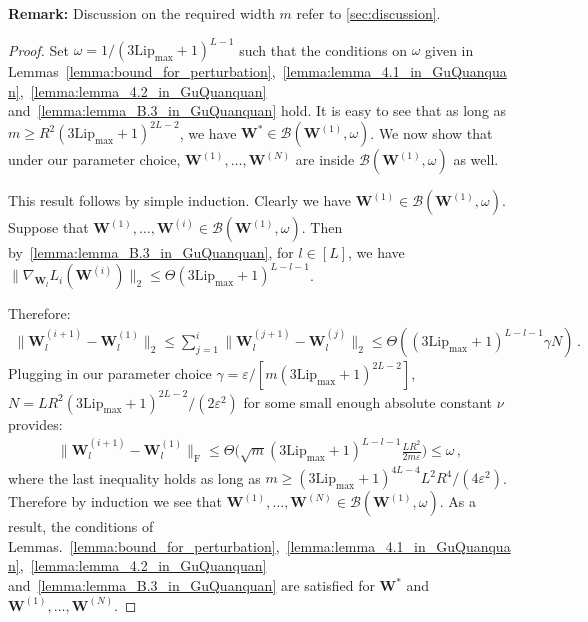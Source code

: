 \documentclass[nohyperref]{article}
\theoremstyle{plain}
\theoremstyle{definition}
\theoremstyle{remark}
\begin{document}
{\bf Remark:} Discussion on the required width $m$ refer to \cref{sec:discussion}.
\begin{proof}
Set $\omega = 1/(3\mathrm{Lip}_{\max}+1)^{L-1}$ such that the conditions on $\omega$ given in Lemmas~\ref{lemma:bound_for_perturbation},~\ref{lemma:lemma_4.1_in_GuQuanquan},~\ref{lemma:lemma_4.2_in_GuQuanquan} and~\ref{lemma:lemma_B.3_in_GuQuanquan} hold. It is easy to see that as long as $m \geq R^2 (3\mathrm{Lip}_{\max}+1)^{2L-2}$, we have $\bm{W}^* \in \mathcal{B} (\bm{W}^{(1)}, \omega)$. 
We now show that under our parameter choice, 
$\bm{W}^{(1)},\ldots,\bm{W}^{(N)} $ are inside $ \mathcal{B} (\bm{W}^{(1)}, \omega)$ as well. 

This result follows by simple induction. Clearly we have $\bm{W}^{(1)} \in \mathcal{B} (\bm{W}^{(1)}, \omega)$. Suppose that $ \bm{W}^{(1)},\ldots, \bm{W}^{(i)} \in \mathcal{B} (\bm{W}^{(1)}, \omega) $. Then by~\cref{lemma:lemma_B.3_in_GuQuanquan}, for $l\in [L]$, we have $\|\nabla_{\bm{W}_l} L_i(\bm{W}^{(i)})\|_2 \leq \Theta(3\mathrm{Lip}_{\max}+1)^{L-l-1}$.

Therefore:
\begin{align*}
    \big\| \bm{W}_l^{(i+1)} - \bm{W}_l^{(1)} \big\|_2 \leq \sum_{j  = 1}^i\big\| \bm{W}_l^{(j+1)} - \bm{W}_l^{(j)} \big\|_2 \leq \Theta((3\mathrm{Lip}_{\max}+1)^{L-l-1}\gamma N)\,.
\end{align*}
Plugging in our parameter choice 
$\gamma = \varepsilon/[m(3\mathrm{Lip}_{\max}+1)^{2L-2}]$, $N = LR^2(3\mathrm{Lip}_{\max}+1)^{2L-2}/(2\varepsilon^2)$
for some small enough absolute constant $\nu$ provides:
\begin{align*}
\big\| \bm{W}_l^{(i+1)} - \bm{W}_l^{(1)} \big\|_{\mathrm{F}} \leq\Theta\bigg(\sqrt{m}(3\mathrm{Lip}_{\max}+1)^{L-l-1}\frac{LR^2}{2m\varepsilon}\bigg) \leq \omega\,,
\end{align*}
where the last inequality holds as long as $m \geq (3\mathrm{Lip}_{\max}+1)^{4L-4}L^2R^4/(4\varepsilon^2)$. Therefore by induction we see that $\bm{W}^{(1)},\ldots,\bm{W}^{(N)} \in \mathcal{B} (\bm{W}^{(1)}, \omega)$. As a result, the conditions of Lemmas.~\ref{lemma:bound_for_perturbation},~\ref{lemma:lemma_4.1_in_GuQuanquan},~\ref{lemma:lemma_4.2_in_GuQuanquan} and~\ref{lemma:lemma_B.3_in_GuQuanquan} are satisfied for $\bm{W}^*$ and $\bm{W}^{(1)},\ldots, \bm{W}^{(N)}$.


\end{proof}
\end{document}
